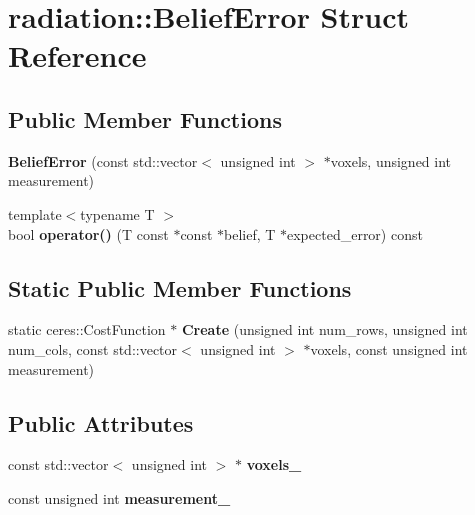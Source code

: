 \hypertarget{structradiation_1_1_belief_error}{}\section{radiation\+:\+:Belief\+Error Struct Reference}
\label{structradiation_1_1_belief_error}
\subsection*{Public Member Functions}
\begin{DoxyCompactItemize}
\item 
\hypertarget{structradiation_1_1_belief_error_afe05bfba363694b7875347da9527ba60}{}\label{structradiation_1_1_belief_error_afe05bfba363694b7875347da9527ba60} 
{\bfseries Belief\+Error} (const std\+::vector$<$ unsigned int $>$ $\ast$voxels, unsigned int measurement)
\item 
\hypertarget{structradiation_1_1_belief_error_ae6f3fb3e795a255e840ce37f7765a43d}{}\label{structradiation_1_1_belief_error_ae6f3fb3e795a255e840ce37f7765a43d} 
{\footnotesize template$<$typename T $>$ }\\bool {\bfseries operator()} (T const $\ast$const $\ast$belief, T $\ast$expected\+\_\+error) const
\end{DoxyCompactItemize}
\subsection*{Static Public Member Functions}
\begin{DoxyCompactItemize}
\item 
\hypertarget{structradiation_1_1_belief_error_ab6efeeae21abcfeb7897dc5310193577}{}\label{structradiation_1_1_belief_error_ab6efeeae21abcfeb7897dc5310193577} 
static ceres\+::\+Cost\+Function $\ast$ {\bfseries Create} (unsigned int num\+\_\+rows, unsigned int num\+\_\+cols, const std\+::vector$<$ unsigned int $>$ $\ast$voxels, const unsigned int measurement)
\end{DoxyCompactItemize}
\subsection*{Public Attributes}
\begin{DoxyCompactItemize}
\item 
\hypertarget{structradiation_1_1_belief_error_ae74f7c931d6e53006d17ad6768f1a289}{}\label{structradiation_1_1_belief_error_ae74f7c931d6e53006d17ad6768f1a289} 
const std\+::vector$<$ unsigned int $>$ $\ast$ {\bfseries voxels\+\_\+}
\item 
\hypertarget{structradiation_1_1_belief_error_a8bd1d2963e7729c0abafa3592a1571b7}{}\label{structradiation_1_1_belief_error_a8bd1d2963e7729c0abafa3592a1571b7} 
const unsigned int {\bfseries measurement\+\_\+}
\end{DoxyCompactItemize}


